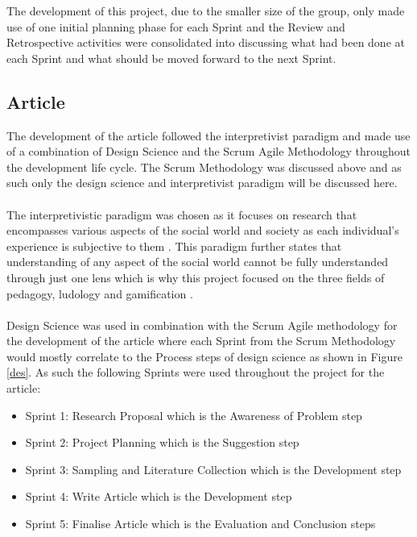 \noindent The development of this project, due to the smaller size of the group, only made use of one initial planning phase for each Sprint and the Review and Retrospective activities were consolidated into discussing what had been done at each Sprint and what should be moved forward to the next Sprint.

\subsection{Article}
The development of the article followed the interpretivist paradigm and made use of a combination of Design Science and the Scrum Agile Methodology throughout the development life cycle. The Scrum Methodology was discussed above and as such only the design science and interpretivist paradigm will be discussed here. 
\\\\
The interpretivistic paradigm was chosen as it focuses on research that encompasses various aspects of the social world and society as each individual's  experience is subjective to them \citep{kivunja2017understanding}. This paradigm further states that understanding of any aspect of the social world cannot be fully understanded through just one lens which is why this project focused on the three fields of pedagogy, ludology and gamification \citep{kivunja2017understanding}.
\\\\
Design Science was used in combination with the Scrum Agile methodology for the development of the article where each Sprint from the Scrum Methodology would mostly correlate to the Process steps of design science as shown in Figure \ref{des}. As such the following Sprints were used throughout the project for the article:
\begin{itemize}
\item Sprint 1: Research Proposal which is the Awareness of Problem step
\item Sprint 2: Project Planning which is the Suggestion step
\item Sprint 3: Sampling and Literature Collection which is the Development step
\item Sprint 4: Write Article which is the Development step
\item Sprint 5: Finalise Article which is the Evaluation and Conclusion steps
\end{itemize}

\newpage 

